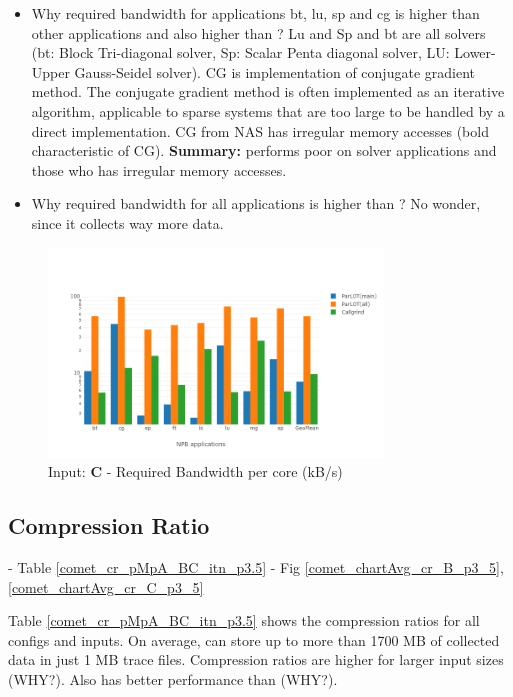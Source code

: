 \begin{itemize}
\item Why \parlotm required bandwidth for applications bt, lu, sp and cg is higher than other applications and also higher than \callgrind ? Lu and Sp and bt are all solvers (bt: Block Tri-diagonal solver, Sp: Scalar Penta diagonal solver, LU: Lower-Upper Gauss-Seidel solver). CG is implementation of conjugate gradient method. The conjugate gradient method is often implemented as an iterative algorithm, applicable to sparse systems that are too large to be handled by a direct implementation. CG from NAS has irregular memory accesses (bold characteristic of CG). \textbf{Summary:} \parlotm performs poor on solver applications and those who has irregular memory accesses.

\item Why \parlota required bandwidth for all applications is higher than \callgrind? No wonder, since it collects way more data.

\end{itemize}



\begin{figure}[!t]
\centering
\includegraphics[width=3.5in]{figs.comet.newMed/comet_chartAvg_bw_C_p3_5.png}
\caption{ Input: \textbf{C}  - Required Bandwidth per core (kB/s)
}
\label{comet_chartAvg_bw_C_p3_5}
\end{figure}


  
\subsection{Compression Ratio}
\label{subsec:cr}
 - Table \ref{comet_cr_pMpA_BC_itn_p3.5}
  - Fig \ref{comet_chartAvg_cr_B_p3_5}, \ref{comet_chartAvg_cr_C_p3_5}

  Table \ref{comet_cr_pMpA_BC_itn_p3.5} shows the compression ratios for all configs and inputs. On average, \parlot can store up to more than 1700 MB of collected data in just 1 MB trace files. Compression ratios are higher for larger input sizes (WHY?). Also \parlotm has better performance than \parlota (WHY?).
  
